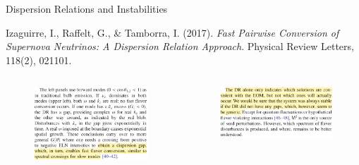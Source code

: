 \begin{frame}{Dispersion Relations and Instabilities}

   \begin{tcolorbox}[standard jigsaw,opacityback=0]
      \color{white}
      \small
      Izaguirre, I., Raffelt, G., \& Tamborra, I. (2017). \emph{Fast Pairwise Conversion of Supernova Neutrinos: A Dispersion Relation Approach}. Physical Review Letters, 118(2), 021101.
   \end{tcolorbox}
\vspace{-0.7em}
   \begin{tcolorbox}

\begin{columns}[T]
   \begin{column}{0.5\textwidth}
      \begin{figure}
         \includegraphics[width=\textwidth]{assets/dr/izaguirre2.jpg}
      \end{figure}
   \end{column}%
   \begin{column}{0.5\textwidth}
      \begin{figure}
         \includegraphics[width=\textwidth]{assets/dr/izaguirre3.jpg}
      \end{figure}
   \end{column}
\end{columns}
\end{tcolorbox}



\end{frame}
